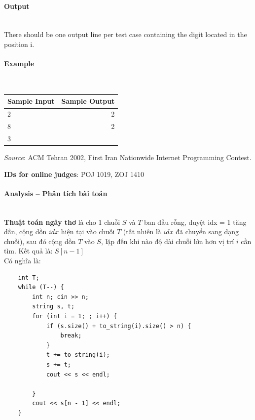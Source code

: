 \documentclass{article}
\begin{document}
\paragraph{Output}\mbox{} \\

There should be one output line per test case containing the digit located in the position i.

\paragraph{Example}\mbox{} \\

\begin{table}[h]
    \centering
    \begin{tabular}{|l|r|}
        \hline
        \textbf{Sample Input} & \textbf{Sample Output} \\
        \hline
         2   & 2  \\ 
         8  &  2 \\ 
         3  &  \\ \hline
    \end{tabular}
\end{table}

\textit{Source}: ACM Tehran 2002, First Iran Nationwide Internet Programming Contest.

\textbf{IDs for online judges}: POJ 1019, ZOJ 1410


\paragraph{Analysis -- Phân tích bài toán} \mbox{} \\

\textbf{Thuật toán ngây thơ} là cho 1 chuỗi $S$ và $T$ ban đầu rỗng, duyệt idx = 1 tăng dần, cộng dồn $idx$ hiện tại vào chuỗi $T$ (tất nhiên là $idx$ đã chuyển sang dạng chuỗi), sau đó cộng dồn $T$ vào $S$, lặp đến khi nào độ dài chuỗi lớn hơn vị trí $i$ cần tìm. Kết quả là: $S[n-1]$\\

Có nghĩa là:

\begin{lstlisting}
    int T; 
	while (T--) {
		int n; cin >> n;
		string s, t;
		for (int i = 1; ; i++) {
			if (s.size() + to_string(i).size() > n) {
				break;
			}
			t += to_string(i);
			s += t;
			cout << s << endl;

		}
		cout << s[n - 1] << endl;
	}
\end{lstlisting}
\end{document}
